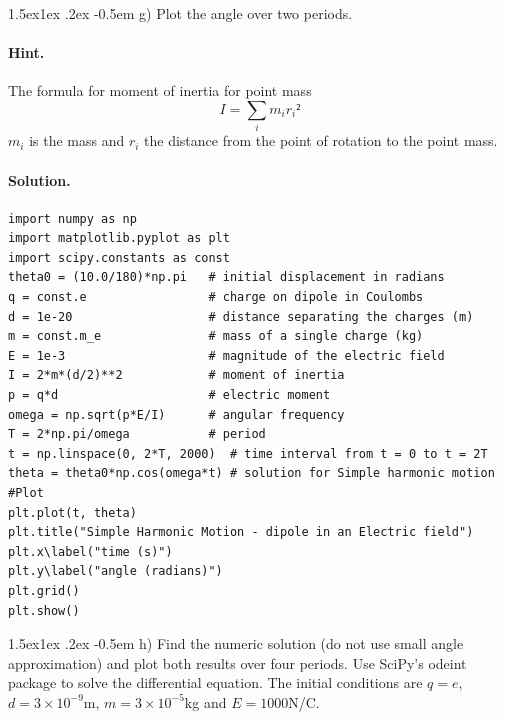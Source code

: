 \documentclass[%
oneside,                 %
final,                   %
10pt]{article}
\makeatletter
\newenvironment{doconceexercise}{}{}
\newcommand\subex{\@startsection{paragraph}{4}{\z@}%
                  {1.5ex\@plus1ex \@minus.2ex}%
                  {-0.5em}%
                  {\normalfont\normalsize\bfseries}}
\makeatother
\begin{document}
\begin{doconceexercise}

\subex{g)}
Plot the angle over two periods.


\paragraph{Hint.}
The formula for moment of inertia for point mass
\begin{equation}
I = \sum_i m_ir_i² 
\end{equation}
$m_i$ is the mass and $r_i$ the distance from the point of rotation to the point mass.



\paragraph{Solution.}
\begin{verbatim}
import numpy as np
import matplotlib.pyplot as plt
import scipy.constants as const
theta0 = (10.0/180)*np.pi   # initial displacement in radians
q = const.e                 # charge on dipole in Coulombs
d = 1e-20                   # distance separating the charges (m)
m = const.m_e               # mass of a single charge (kg)
E = 1e-3                    # magnitude of the electric field
I = 2*m*(d/2)**2            # moment of inertia
p = q*d                     # electric moment
omega = np.sqrt(p*E/I)      # angular frequency
T = 2*np.pi/omega           # period
t = np.linspace(0, 2*T, 2000)  # time interval from t = 0 to t = 2T
theta = theta0*np.cos(omega*t) # solution for Simple harmonic motion
#Plot
plt.plot(t, theta)
plt.title("Simple Harmonic Motion - dipole in an Electric field")
plt.x\label("time (s)")
plt.y\label("angle (radians)")
plt.grid()
plt.show()
\end{verbatim}


\subex{h)}
Find the numeric solution (do not use small angle approximation) and plot both results over four periods. Use SciPy's odeint package to solve the differential equation. The initial conditions are $q = e$, $d=3\times 10^{-9}$m, $m=3\times 10^{-5}$kg and $E=1000$N/C.



\end{doconceexercise}
\end{document}
